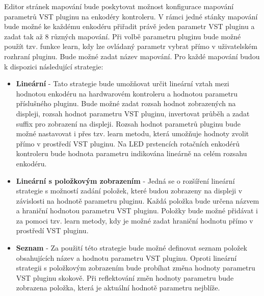 \documentclass[thesis=M,czech]{FITthesis}[2019/03/06]
\begin{document}
	Editor stránek mapování bude poskytovat možnost konfigurace mapování parametrů VST pluginu na enkodéry kontroleru.
	V rámci jedné stánky mapování bude možné ke každému enkodéru přiřadit právě jeden parametr VST pluginu a zadat tak až 8 různých mapování.
	Při volbě parametru pluginu bude možné použít tzv. funkce learn, kdy lze ovládaný parametr vybrat přímo v uživatelském rozhraní pluginu.
	Bude možné zadat název mapování.
	Pro každé mapování budou k dispozici následující strategie:
	\begin{itemize}
		\item\label{LinearMappingStrategy} \textbf{Lineární} - Tato strategie bude umožňovat určit lineární vztah mezi hodnotou enkodéru na hardwarovém kontroleru 
		a hodnotou parametru příslušného pluginu. Bude možné zadat rozsah hodnot zobrazených na displeji, rozsah hodnot parametru VST pluginu, invertovat
		průběh a zadat suffix pro zobrazení na displeji. Rozsah hodnot parametrů pluginu bude možné nastavovat i přes tzv. learn metodu, která 
		umožňuje hodnoty zvolit přímo v prostředí VST pluginu. Na LED prstencích rotačních enkodérů kontroleru bude hodnota parametru indikována lineárně na celém rozsahu enkodéru.
		
		\item \textbf{Lineární s položkovým zobrazením} - Jedná se o rozšíření lineární strategie s možností zadání položek, které
		budou zobrazeny na displeji v závislosti na hodnotě parametru pluginu. Každá položka bude určena názvem a hraniční hodnotou parametru VST pluginu.
		Položky bude možné přidávat i za pomoci tzv. learn metody, kdy je možné zadat hraniční hodnotu přímo v prostředí VST pluginu.
		
		\item \textbf{Seznam} - Za použití této strategie bude možné definovat seznam položek obsahujících název a hodnotu parametru VST pluginu.
		Oproti lineární strategii s položkovým zobrazením bude probíhat změna hodnoty parametru VST pluginu skokově. Při reflektování změn hodnoty parametru bude zobrazena
		položka, která je aktuální hodnotě parametru nejblíže.
	\end{itemize}
	
\end{document}
